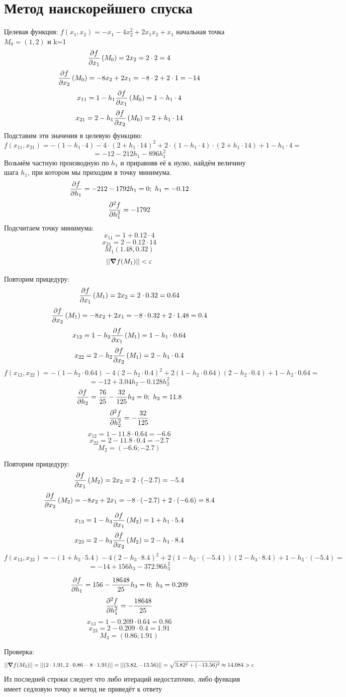 \documentclass{article}
\begin{document}
\section*{Метод наискорейшего спуска}
Целевая функция: $f(x_1, x_2) = -x_1-4x_2^2+2x_1x_2+x_1$ начальная точка $M_0 = (1, 2)$ и k=1
\[\pdv{f}{x_1} \left(M_0\right) = 2x_2 = 2\cdot 2 = 4\]
\[\pdv{f}{x_2} \left(M_0\right) = -8x_2+2x_1 = -8\cdot 2+ 2\cdot 1 = -14\]
\[x_{11} = 1 - h_1 \pdv{f}{x_1} \left(M_0\right) = 1 - h_1\cdot 4 \]
\[x_{21} = 2 - h_1 \pdv{f}{x_2} \left(M_0\right) = 2 + h_1\cdot 14 \]
Подставим эти значения в целевую функцию:
\[f(x_{11}, x_{21}) = -(1 - h_1\cdot 4) - 4\cdot (2 + h_1\cdot 14)^2 + 2\cdot (1 - h_1\cdot 4)\cdot (2 + h_1\cdot 14) +  1 - h_1\cdot 4 =\]
\[= -12 -212h_1-896h_1^2\]
Возьмём частную производную по $h_1$ и приравняв её к нулю, найдём величину шага $h_1$, при котором мы приходим в точку минимума.
\[\pdv{f}{h_1} = -212-1792h_1 = 0;\ h_1 = -0.12\]
\[\pdv{^2f}{h_1^2} = -1792\]
Подсчитаем точку минимума:
\[x_{11} = 1 + 0.12\cdot 4\]
\[x_{21} = 2 - 0.12\cdot 14\]
\[M_1(1.48, 0.32)\]
\[||\grad f(M_1)|| < \varepsilon\]

Повторим прицедуру:
\[\pdv{f}{x_1} \left(M_1\right) = 2x_2 = 2\cdot 0.32 = 0.64\]
\[\pdv{f}{x_2} \left(M_1\right) = -8x_2+2x_1 = -8\cdot 0.32+ 2\cdot 1.48 = 0.4\]
\[x_{12} = 1 - h_2 \pdv{f}{x_1} \left(M_1\right) = 1 - h_1\cdot 0.64 \]
\[x_{22} = 2 - h_2 \pdv{f}{x_2} \left(M_1\right) = 2 - h_1\cdot 0.4 \]
\[f(x_{12}, x_{22}) = -(1 - h_2\cdot 0.64)-4(2 - h_2\cdot 0.4)^2+2(1 - h_2\cdot 0.64)(2 - h_2\cdot 0.4)+1 - h_2\cdot 0.64 = \]
\[ = -12 + 3.04h_2-0.128h_2^2\]
\[\pdv{f}{h_2} = \frac{76}{25} - \frac{32}{125}h_2 = 0;\ h_2 = 11.8\]
\[\pdv{^2f}{h_2^2} = -\frac{32}{125}\]
\[x_{12} = 1 - 11.8\cdot 0.64  = -6.6\]
\[x_{22} = 2 - 11.8\cdot 0.4 = -2.7\]
\[M_2 = (-6.6; -2.7)\]

Повторим прицедуру:
\[\pdv{f}{x_1} \left(M_2\right) = 2x_2 = 2\cdot (-2.7) = -5.4\]
\[\pdv{f}{x_2} \left(M_2\right) = -8x_2+2x_1 = -8\cdot (-2.7)+ 2\cdot (-6.6) = 8.4\]
\[x_{13} = 1 - h_3 \pdv{f}{x_1} \left(M_2\right) = 1 + h_1\cdot 5.4 \]
\[x_{23} = 2 - h_3 \pdv{f}{x_2} \left(M_2\right) = 2 - h_1\cdot 8.4 \]
\[f(x_{13}, x_{23}) = -(1 + h_3\cdot 5.4 )-4(2 - h_3\cdot 8.4)^2+2(1 - h_3\cdot (-5.4))(2 - h_3\cdot 8.4)+1 - h_3\cdot (-5.4) = \]
\[ = -14+156h_3-372.96h_3^2\]

\[\pdv{f}{h_1} = 156 - \frac{18648}{25}h_3= 0;\ h_3 = 0.209\]
\[\pdv{^2f}{h_1^2} = -\frac{18648}{25}\]
\[x_{13} = 1 - 0.209\cdot 0.64  = 0.86\]
\[x_{23} = 2 - 0.209\cdot 0.4 = 1.91\]
\[M_3 = (0.86; 1.91)\]

Проверка:
\[||\grad f(M_3)|| = ||(2\cdot1.91,2\cdot0.86-8\cdot1.91)|| = ||(3.82,-13.56)|| = \sqrt{3.82^2 + (-13.56)^2} \approx 14.084 > \varepsilon\]
Из последней строки следует что либо итераций недостаточно, либо функция имеет седловую точку и метод не приведёт к ответу
\end{document}
